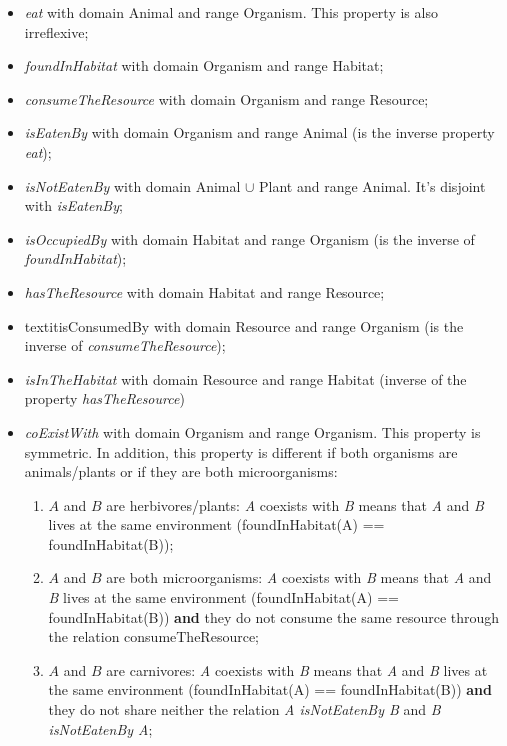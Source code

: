     \begin{itemize}
        \item \textit{eat} with domain Animal and range Organism. This property is also irreflexive;

        \item \textit{foundInHabitat} with domain Organism and range Habitat;

        \item \textit{consumeTheResource} with domain Organism and range Resource;

        \item \textit{isEatenBy} with domain Organism and range Animal (is the inverse property \textit{eat});

        \item \textit{isNotEatenBy} with domain Animal $\cup$ Plant and range Animal. It's disjoint with \textit{isEatenBy};

        \item \textit{isOccupiedBy} with domain Habitat and range Organism (is the inverse of \textit{foundInHabitat});

        \item \textit{hasTheResource} with domain Habitat and range Resource;

        \item textit{isConsumedBy} with domain Resource and range Organism (is the inverse of \textit{consumeTheResource});

        \item \textit{isInTheHabitat} with domain Resource and range Habitat (inverse of the property \textit{hasTheResource})

        \item \textit{coExistWith} with domain Organism and range Organism. This property is symmetric. In addition, this property is different if both organisms are animals/plants or if they are both microorganisms:
        \begin{enumerate}
            \item $A$ and $B$ are herbivores/plants: \textit{A} coexists with \textit{B} means that \textit{A} and \textit{B} lives at the same environment (foundInHabitat(A) == foundInHabitat(B));

            \item $A$ and $B$ are both microorganisms: \textit{A} coexists with \textit{B} means that \textit{A} and \textit{B} lives at the same environment (foundInHabitat(A) == foundInHabitat(B)) \textbf{and} they do not consume the same resource through the relation consumeTheResource;

            \item $A$ and $B$ are carnivores: \textit{A} coexists with \textit{B} means that \textit{A} and \textit{B} lives at the same environment (foundInHabitat(A) == foundInHabitat(B)) \textbf{and} they do not share neither the relation \textit{A isNotEatenBy B} and \textit{B isNotEatenBy A};
            \bigskip
            
        \end{enumerate}
    \end{itemize}

